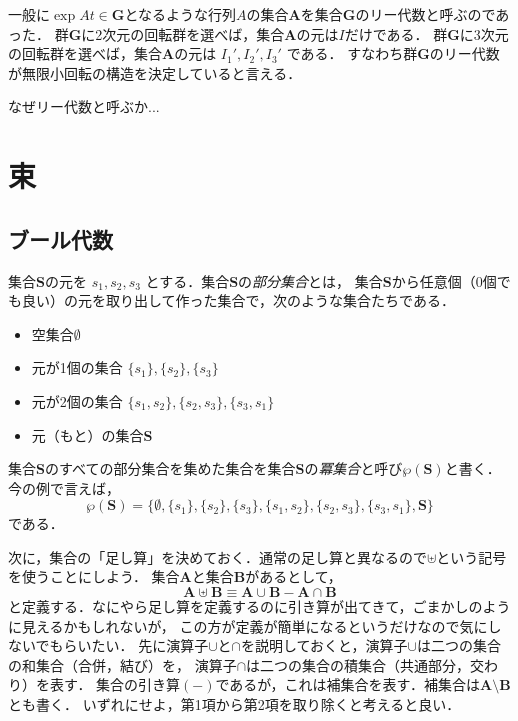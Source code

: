 \documentclass{jsbook}
\newcommand{\keyword}[1]{\emph{#1}}
\newcommand{\bg}[1]{\mathbf{#1}}
\begin{document}
一般に$\exp At\in\bg{G}$となるような行列$A$の集合$\bg{A}$を集合$\bg{G}$のリー代数と呼ぶのであった．
群$\bg{G}$に2次元の回転群を選べば，集合$\bg{A}$の元は$I$だけである．
群$\bg{G}$に3次元の回転群を選べば，集合$\bg{A}$の元は $I_1',I_2',I_3'$ である．
すなわち群$\bg{G}$のリー代数が無限小回転の構造を決定していると言える．

なぜリー代数と呼ぶか...


\chapter{束}

\section{ブール代数}

集合$\bg{S}$の元を $s_1,s_2,s_3$ とする．集合$\bg{S}$の\keyword{部分集合}とは，
集合$\bg{S}$から任意個（0個でも良い）の元を取り出して作った集合で，次のような集合たちである．
\begin{itemize}
\item 空集合$\emptyset$
\item 元が1個の集合 $\{s_1\},\{s_2\},\{s_3\}$
\item 元が2個の集合 $\{s_1,s_2\},\{s_2,s_3\},\{s_3,s_1\}$
\item 元（もと）の集合$\bg{S}$
\end{itemize}
集合$\bg{S}$のすべての部分集合を集めた集合を集合$\bg{S}$の\keyword{冪集合}と呼び$\wp(\bg{S})$と書く．
今の例で言えば，
\begin{equation}
\wp(\bg{S})=\{\emptyset,\{s_1\},\{s_2\},\{s_3\},\{s_1,s_2\},\{s_2,s_3\},\{s_3,s_1\},\bg{S}\}
\end{equation}
である．

次に，集合の「足し算」を決めておく．通常の足し算と異なるので$\uplus$という記号を使うことにしよう．
集合$\bg{A}$と集合$\bg{B}$があるとして，
\begin{equation}
\bg{A}\uplus\bg{B}\equiv\bg{A}\cup\bg{B}-\bg{A}\cap\bg{B}
\end{equation}
と定義する．なにやら足し算を定義するのに引き算が出てきて，ごまかしのように見えるかもしれないが，
この方が定義が簡単になるというだけなので気にしないでもらいたい．
先に演算子$\cup$と$\cap$を説明しておくと，演算子$\cup$は二つの集合の和集合（合併，結び）を，
演算子$\cap$は二つの集合の積集合（共通部分，交わり）を表す．
集合の引き算$(-)$であるが，これは補集合を表す．補集合は$\bg{A}\setminus\bg{B}$とも書く．
いずれにせよ，第1項から第2項を取り除くと考えると良い．
\end{document}
